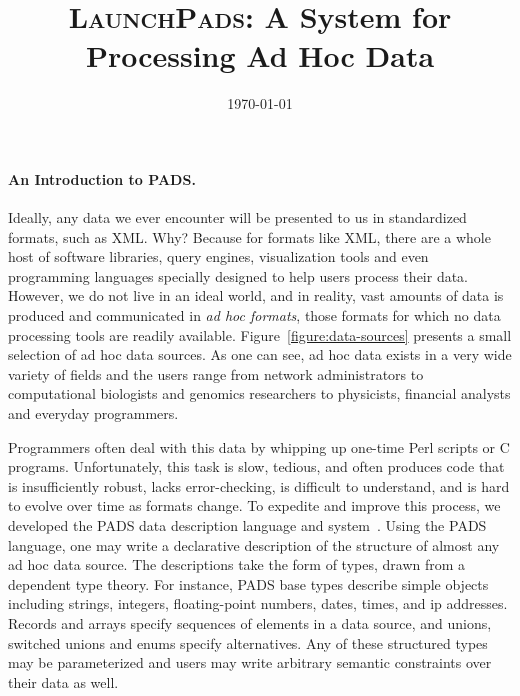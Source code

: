 \documentclass[nocopyrightspace]{sigplanconf}
\title{\textsc{LaunchPads}: A System for Processing Ad Hoc Data}
\date{\today}
\begin{document}
\maketitle


\paragraph*{An Introduction to PADS.}
Ideally, any data we ever encounter will be presented to us
in standardized formats, such as \textsc{XML}.  Why?  Because
for formats like \textsc{XML}, there are a whole host of software libraries,
query engines, visualization tools and even programming languages
specially designed to help users process their data.
However, we do not live in an ideal world, and in reality, 
vast amounts of data is produced and communicated 
in \textit{ad hoc formats}, those formats for which
no data processing tools are readily available.  Figure~\ref{figure:data-sources} presents a small selection of ad hoc data sources.
As one can see, ad hoc data exists in a very wide variety of fields
and the users range from network administrators to computational 
biologists and genomics researchers to physicists, financial 
analysts and everyday programmers.

Programmers often deal with this data by whipping up one-time Perl scripts
or C programs.  Unfortunately, this
task is slow, tedious, and often produces code that is insufficiently robust,
lacks error-checking, is
difficult to understand, and is hard to evolve over time as formats change.  
To expedite and improve this process, we developed
the \textsc{PADS} data description language and system~\cite{fisher+:pldi05,fisher+:popl06}.  Using the
\textsc{PADS} language, one may write a declarative
description of the structure of almost any ad hoc data source.  
The descriptions take the form of types,
drawn from a dependent type theory.  For instance, \textsc{PADS} 
base types describe simple objects including
strings, integers, floating-point numbers, dates, times, and ip addresses.
Records and arrays specify sequences of elements in a data source, 
and unions, switched unions and enums specify
alternatives.  Any of these structured types may be 
parameterized and
users may write arbitrary semantic constraints over their data
as well.
\end{document}
